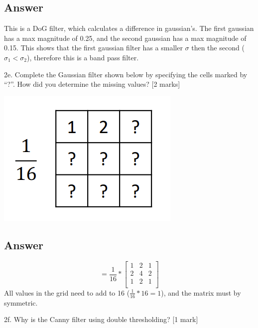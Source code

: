 \documentclass[
	12pt, %
]{fphw}
\begin{document}
\subsection*{Answer}
This is a DoG filter, which calculates a difference in gaussian's. The first gaussian has a max magnitude of 0.25, and the second gaussian has a max magnitude of 0.15. This shows that the first gaussian filter has a smaller $\sigma$ then the second ($\sigma_1 < \sigma_2$), therefore this is a band pass filter. 
\begin{problem}
2e. Complete the Gaussian filter shown below by specifying the cells marked by “?”.
How did you determine the missing values? [2 marks]
\begin{center}
	\includegraphics[width=0.5\columnwidth, page=1]{2e.png}
\end{center}
\end{problem}
\subsection*{Answer}
\[
= \frac{1}{16} * 
  \begin{bmatrix}
    1 & 2 & 1 \\
	2 & 4 & 2 \\
	1 & 2 & 1 \\
  \end{bmatrix}
\]
All values in the grid need to add to 16 ($\frac{1}{16}* 16 = 1$), and the matrix must by symmetric.
\begin{problem}
2f. Why is the Canny filter using double thresholding? [1 mark]
\end{problem}
\end{document}
